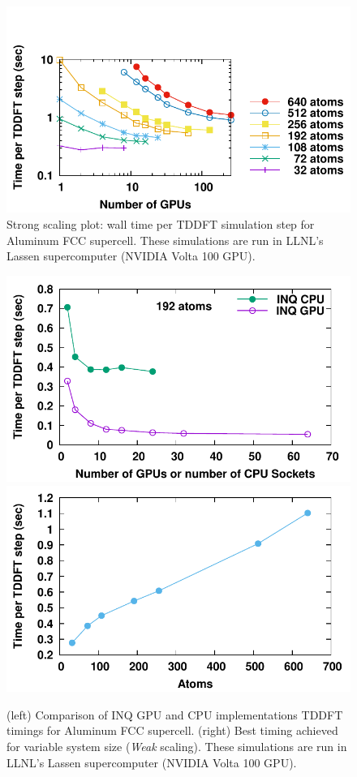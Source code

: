 \begin{figure}[h]
	\centering
	\includegraphics[width=0.5\linewidth]{figures/scaling/strong}
	\caption{\small
		Strong scaling plot: wall time per TDDFT simulation step for Aluminum FCC supercell.
		These simulations are run in LLNL's Lassen supercomputer (NVIDIA Volta 100 GPU).
	}
	\label{fig:scaling_strong}
\end{figure}

\begin{figure}[h]
	\centering
	\includegraphics[width=0.45\linewidth]{figures/scaling/gpu_vs_cpu}
	\includegraphics[width=0.45\linewidth]{figures/scaling/weak}
	\caption{\small
		(left)  Comparison of INQ GPU and CPU implementations TDDFT timings for Aluminum FCC supercell.
		(right) Best timing achieved for variable system size (\emph{Weak} scaling).
		These simulations are run in LLNL's Lassen supercomputer (NVIDIA Volta 100 GPU).
	}
	\label{fig:scaling_gpu_vs_cpu}
	\label{fig:scaling_weak}
\end{figure}

